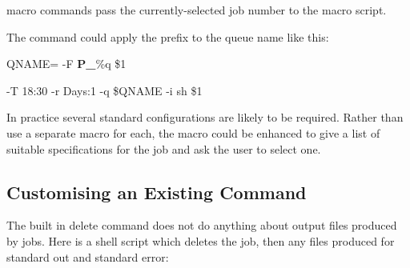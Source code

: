 \PrBtq{} macro commands pass the currently-selected job number to the macro script.

The \PrBtjlist{} command could apply the prefix to the queue name like this:

\begin{expara}

QNAME={\textasciigrave}\BtjlistName{} -F {\textquotedbl}\textbf{P\_}\%q{\textquotedbl} \$1{\textasciigrave}

\BtjlistName{} -T 18:30 -r Days:1 -q \$QNAME -i sh \$1

\end{expara}

In practice several standard configurations are likely to be required. Rather than use a separate macro for each, the macro could be enhanced to give a list of suitable specifications for the job and ask the user to select one.

\subsection{Customising an Existing Command}
The built in delete command does not do anything about output files produced by jobs. Here is a shell script which deletes the job, then
any files produced for standard out and standard error:

